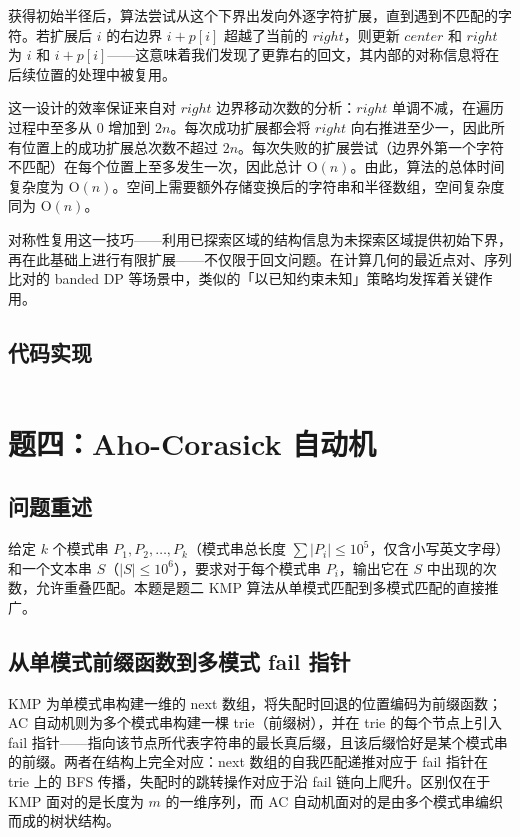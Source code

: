 \documentclass[12pt, a4paper]{academics}
\begin{document}
获得初始半径后，算法尝试从这个下界出发向外逐字符扩展，直到遇到不匹配的字符。若扩展后 $i$ 的右边界 $i + p[i]$ 超越了当前的 $\mathit{right}$，则更新 $\mathit{center}$ 和 $\mathit{right}$ 为 $i$ 和 $i + p[i]$——这意味着我们发现了更靠右的回文，其内部的对称信息将在后续位置的处理中被复用。

这一设计的效率保证来自对 $\mathit{right}$ 边界移动次数的分析：$\mathit{right}$ 单调不减，在遍历过程中至多从 $0$ 增加到 $2n$。每次成功扩展都会将 $\mathit{right}$ 向右推进至少一，因此所有位置上的成功扩展总次数不超过 $2n$。每次失败的扩展尝试（边界外第一个字符不匹配）在每个位置上至多发生一次，因此总计 $\mathrm{O}(n)$。由此，算法的总体时间复杂度为 $\mathrm{O}(n)$。空间上需要额外存储变换后的字符串和半径数组，空间复杂度同为 $\mathrm{O}(n)$。

对称性复用这一技巧——利用已探索区域的结构信息为未探索区域提供初始下界，再在此基础上进行有限扩展——不仅限于回文问题。在计算几何的最近点对、序列比对的 banded DP 等场景中，类似的「以已知约束未知」策略均发挥着关键作用。

\subsection{代码实现}

\inputminted{c++}{../src/p3_manacher.cpp}

\section{题四：Aho-Corasick 自动机}

\subsection{问题重述}

给定 $k$ 个模式串 $P_1, P_2, \dots, P_k$（模式串总长度 $\sum |P_i| \le 10^5$，仅含小写英文字母）和一个文本串 $S$（$|S| \le 10^6$），要求对于每个模式串 $P_i$，输出它在 $S$ 中出现的次数，允许重叠匹配。本题是题二 KMP 算法从单模式匹配到多模式匹配的直接推广。

\subsection{从单模式前缀函数到多模式 fail 指针}

KMP 为单模式串构建一维的 next 数组，将失配时回退的位置编码为前缀函数；AC 自动机则为多个模式串构建一棵 trie（前缀树），并在 trie 的每个节点上引入 fail 指针——指向该节点所代表字符串的最长真后缀，且该后缀恰好是某个模式串的前缀。两者在结构上完全对应：next 数组的自我匹配递推对应于 fail 指针在 trie 上的 BFS 传播，失配时的跳转操作对应于沿 fail 链向上爬升。区别仅在于 KMP 面对的是长度为 $m$ 的一维序列，而 AC 自动机面对的是由多个模式串编织而成的树状结构。
\end{document}
